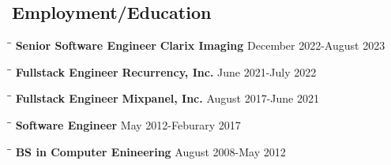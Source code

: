 \documentclass{res}
\begin{document}
 
\thispagestyle{empty} %
\address{\url{https://github.com/ksiondag}\\
  ksiondag846@gmail.com\\
  (520) 329-5081\\
  Chicago, IL}


\begin{resume}

  \section{Employment/Education}
  \vspace{-0.1in}
  \begin{tabbing}
    \hspace{2.2in}\= \hspace{2.2in}\= \kill
    {\bf Senior Software Engineer} \> {\bf Clarix Imaging}     \>December 2022-August 2023
  \end{tabbing}\vspace{-5pt}
  
  \vspace{-20pt}\begin{tabbing}
    \hspace{2.2in}\= \hspace{2.2in}\= \kill
    {\bf Fullstack Engineer} \> {\bf Recurrency, Inc.}     \>June 2021-July 2022
  \end{tabbing}\vspace{-5pt}
  
  \vspace{-20pt}\begin{tabbing}
    \hspace{2.2in}\= \hspace{2.2in}\= \kill
    {\bf Fullstack Engineer} \> {\bf Mixpanel, Inc.}     \>August 2017-June 2021
  \end{tabbing}\vspace{-5pt}
  
  \vspace{-20pt}\begin{tabbing}
    \hspace{2.2in}\= \hspace{2.2in}\= \kill
    {\bf Software Engineer}  \> May 2012-Feburary 2017
  \end{tabbing}\vspace{-5pt}
  
  \vspace{-20pt}\begin{tabbing}
    \hspace{2.2in}\= \hspace{2.2in}\= \kill
    {\bf BS in Computer Enineering}  \> August 2008-May 2012\\
  \end{tabbing}\vspace{-5pt}
  

\end{resume}
\end{document}
